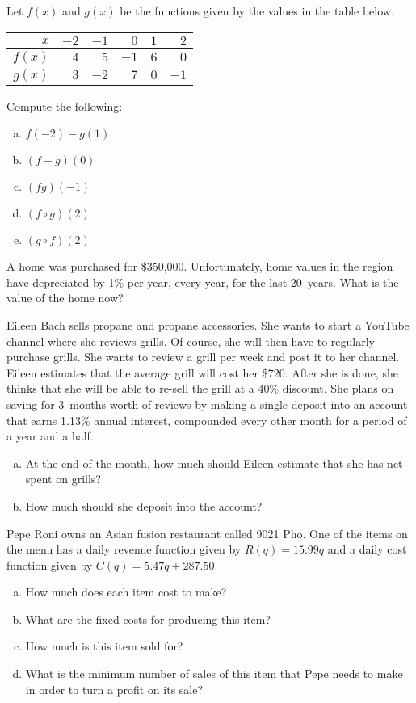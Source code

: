 \documentclass[11pt,letterpaper]{article}
\begin{document}
\prob	 Let $f(x)$ and $g(x)$ be the functions given by the values in the table below. \par
	\begin{table}[H]
	\centering
	\begin{tabular}{r||rrrrr}
	$x$ & $-2$ & $-1$ & $0$ & $1$ & $2$ \\ \hline
	$f(x)$ & $4$ & $5$ & $-1$ & $6$ & $0$ \\
	$g(x)$ & $3$ & $-2$ & $7$ & $0$ & $-1$
	\end{tabular}
	\end{table} \par
Compute the following:
	\begin{enumerate}[(a)]
	\item $f(-2) - g(1)$ 
	\item $(f + g)(0)$
	\item $(fg)(-1)$
	\item $(f \circ g)(2)$
	\item $(g \circ f)(2)$
	\end{enumerate} \pspace
	

\prob	 A home was purchased for \$350,000. Unfortunately, home values in the region have depreciated by 1\% per year, every year, for the last 20~years. What is the value of the home now? \pspace
	
	
\prob	 Eileen Bach sells propane and propane accessories. She wants to start a YouTube channel where she reviews grills. Of course, she will then have to regularly purchase grills. She wants to review a grill per week and post it to her channel. Eileen estimates that the average grill will cost her \$720. After she is done, she thinks that she will be able to re-sell the grill at a 40\% discount. She plans on saving for 3~months worth of reviews by making a single deposit into an account that earns 1.13\% annual interest, compounded every other month for a period of a year and a half. 
	\begin{enumerate}[(a)]
	\item At the end of the month, how much should Eileen estimate that she has net spent on grills?
	\item How much should she deposit into the account? 
	\end{enumerate} \pspace
	
	
\prob	 Pepe Roni owns an Asian fusion restaurant called 9021 Pho. One of the items on the menu has a daily revenue function given by $R(q)= 15.99q$ and a daily cost function given by $C(q)= 5.47q + 287.50$. 
	\begin{enumerate}[(a)]
	\item How much does each item cost to make?
	\item What are the fixed costs for producing this item?
	\item How much is this item sold for?
	\item What is the minimum number of sales of this item that Pepe needs to make in order to turn a profit on its sale?
	\end{enumerate} \pspace
	
\end{document}
